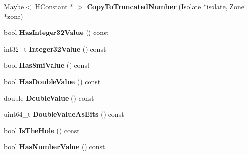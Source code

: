 \begin{DoxyCompactItemize}
\item 
\hyperlink{classv8_1_1_maybe}{Maybe}$<$ \hyperlink{classv8_1_1internal_1_1_h_constant}{H\+Constant} $\ast$ $>$ {\bfseries Copy\+To\+Truncated\+Number} (\hyperlink{classv8_1_1internal_1_1_isolate}{Isolate} $\ast$isolate, \hyperlink{classv8_1_1internal_1_1_zone}{Zone} $\ast$zone)\hypertarget{classv8_1_1internal_1_1_h_constant_a488790ff09c0c272af382550e574b159}{}\label{classv8_1_1internal_1_1_h_constant_a488790ff09c0c272af382550e574b159}

\item 
bool {\bfseries Has\+Integer32\+Value} () const \hypertarget{classv8_1_1internal_1_1_h_constant_a88e8c39ae52527cc6026e4fd91585402}{}\label{classv8_1_1internal_1_1_h_constant_a88e8c39ae52527cc6026e4fd91585402}

\item 
int32\+\_\+t {\bfseries Integer32\+Value} () const \hypertarget{classv8_1_1internal_1_1_h_constant_a311f64be491c89d545e250c5ed0bd6e0}{}\label{classv8_1_1internal_1_1_h_constant_a311f64be491c89d545e250c5ed0bd6e0}

\item 
bool {\bfseries Has\+Smi\+Value} () const \hypertarget{classv8_1_1internal_1_1_h_constant_a76ea73535dc11a06241b6bfa5dda82e3}{}\label{classv8_1_1internal_1_1_h_constant_a76ea73535dc11a06241b6bfa5dda82e3}

\item 
bool {\bfseries Has\+Double\+Value} () const \hypertarget{classv8_1_1internal_1_1_h_constant_ad130e784bebc9220e5605e8fdc01fdc7}{}\label{classv8_1_1internal_1_1_h_constant_ad130e784bebc9220e5605e8fdc01fdc7}

\item 
double {\bfseries Double\+Value} () const \hypertarget{classv8_1_1internal_1_1_h_constant_afa4dcbe4d75fc085789af2911e69aee2}{}\label{classv8_1_1internal_1_1_h_constant_afa4dcbe4d75fc085789af2911e69aee2}

\item 
uint64\+\_\+t {\bfseries Double\+Value\+As\+Bits} () const \hypertarget{classv8_1_1internal_1_1_h_constant_a12f4687586951fc814175f36d7d01fbc}{}\label{classv8_1_1internal_1_1_h_constant_a12f4687586951fc814175f36d7d01fbc}

\item 
bool {\bfseries Is\+The\+Hole} () const \hypertarget{classv8_1_1internal_1_1_h_constant_af24277c7a260590f3635623ac42fdd16}{}\label{classv8_1_1internal_1_1_h_constant_af24277c7a260590f3635623ac42fdd16}

\item 
bool {\bfseries Has\+Number\+Value} () const \hypertarget{classv8_1_1internal_1_1_h_constant_ae6909bdfa2cd74352f5fead017525011}{}\label{classv8_1_1internal_1_1_h_constant_ae6909bdfa2cd74352f5fead017525011}


\end{DoxyCompactItemize}
